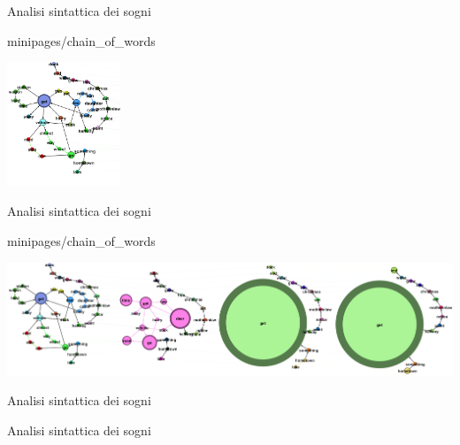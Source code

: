 \documentclass[xcolor=x11names,compress]{beamer}
\begin{document}
\begin{frame}[t]{Analisi sintattica dei sogni}
    \vspace{-0.2cm}
    
    
     {minipages/chain_of_words}
    
    \begin{minipage}[t]{\textwidth}
        \hspace{-0.715cm}
        \includegraphics[width=0.25355637513\textwidth]{immagini/arlie_80_lv0}
    \end{minipage}
\end{frame}

\begin{frame}[t]{Analisi sintattica dei sogni}
    \vspace{-0.2cm}
    
    
     {minipages/chain_of_words}
    
    \begin{minipage}[t]{\textwidth}
        \hspace{-0.7cm}
        \includegraphics[width=1.1\textwidth]{immagini/arlie_80_ml}
    \end{minipage}
\end{frame}

\begin{frame}[t]{Analisi sintattica dei sogni}
    \vspace{-0.5cm}
    
\end{frame}

\begin{frame}[t]{Analisi sintattica dei sogni}
    \vspace{-0.5cm}
    
\end{frame}
\end{document}
